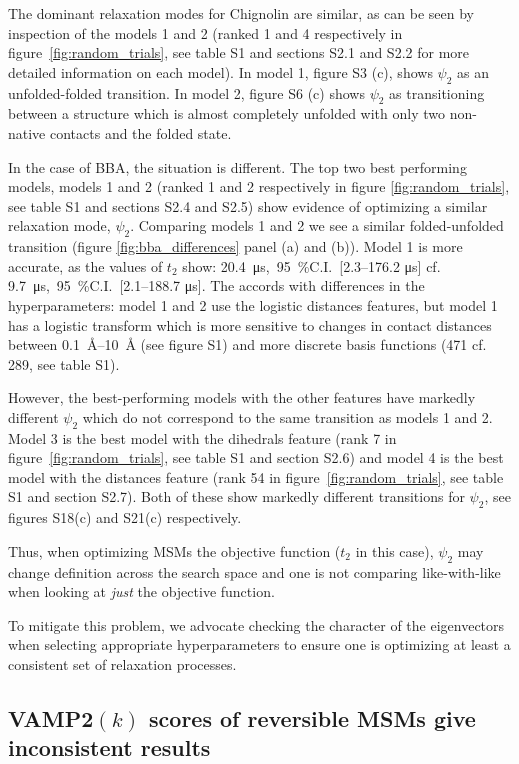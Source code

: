 \documentclass[journal=jacsat,manuscript=article]{achemso}
\newcommand{\SIci}[4]{\SI{#1}{#4},\ \SI{95}{\percent}C.I.\ [\numrange[range-phrase=---]{#2}{#3} \si{#4}]}
\begin{document}
The dominant relaxation modes for Chignolin are similar, as can be seen by inspection of the models 1 and 2 (ranked 1 and 4 respectively in figure~\ref{fig:random_trials}, see table S1 and sections S2.1 and S2.2 for more detailed information on each model).  In model 1, figure S3 (c), shows $\psi_2$ as an unfolded-folded transition.  In model 2, figure S6 (c) shows $\psi_2$ as transitioning between a structure which is almost completely unfolded with only two non-native contacts and the folded state. 

In the case of BBA, the situation is different. The top two best performing models, models 1 and 2 (ranked 1 and 2 respectively in figure \ref{fig:random_trials}, see table S1 and sections S2.4 and S2.5) show evidence of optimizing a similar relaxation mode, $\psi_2$.  Comparing models 1 and 2 we see a similar folded-unfolded transition (figure \ref{fig:bba_differences} panel (a) and (b)). Model 1 is more accurate, as the values of $t_2$ show: \SIci{20.4}{2.3}{176.2}{\micro\second} cf. \SIci{9.7}{2.1}{188.7}{\micro\second}. The accords with differences in the hyperparameters: model 1 and 2 use the logistic distances features, but model 1 has a logistic transform which is more sensitive to changes in contact distances between \SIrange[range-phrase=---]{0.1}{10}{\angstrom} (see figure S1) and more discrete basis functions (471 cf. 289, see table S1).  

However, the best-performing models with the other features have markedly different $\psi_2$ which do not correspond to the same transition as models 1 and 2.  Model 3 is the best model with the dihedrals feature (rank 7 in figure~\ref{fig:random_trials}, see table S1 and section S2.6) and model 4 is the best model with the distances feature (rank 54 in figure~\ref{fig:random_trials}, see table S1 and section S2.7). Both of these show markedly different transitions for $\psi_2$, see figures S18(c) and S21(c) respectively. 

Thus, when optimizing MSMs the objective function ($t_2$ in this case), $\psi_2$ may change definition across the search space and one is not comparing like-with-like when looking at \emph{just} the objective function.  

To mitigate this problem, we advocate checking the character of the eigenvectors when selecting appropriate hyperparameters to ensure one is optimizing at least a consistent set of relaxation processes.  


\subsection{VAMP2$(k)$ scores of reversible MSMs give inconsistent results}\label{sec:vamps_inconsistent}
\end{document}
